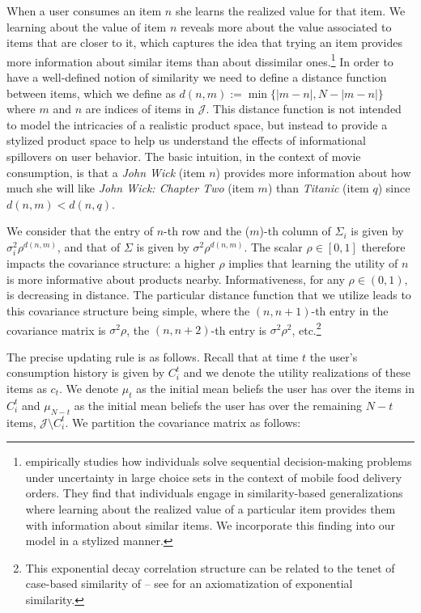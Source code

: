 \documentclass[manuscript]{acmart}
\newcommand{\xhdr}[1]{\vspace{1mm} \noindent{\bf #1}}
\begin{document}
\xhdr{User Learning\dgedit{.}}
When a user consumes an item $n$ she learns the realized value for that item. We   learning about the value of item $n$ reveals more about the value associated to items that are closer to it, which captures the idea that trying an item provides more information about similar items than about dissimilar ones.\footnote{\cite{schulz2019structured} empirically studies how individuals solve sequential decision-making problems under uncertainty in large choice sets in the context of mobile food delivery orders. They find that individuals engage in similarity-based generalizations where learning about the realized value of a particular item provides them with information about similar items. We incorporate this finding into our model in a stylized manner.} In order to have a well-defined notion of similarity we need to define a distance function between items, which we define as $d(n,m):=\min\{ \lvert m - n \rvert ,N - \lvert m - n \rvert \}$ where $m$ and $n$ are indices of items in $\mathcal{J}$. This distance function is not intended to model the intricacies of a realistic product space, but instead to provide a stylized product space to help us understand the effects of informational spillovers on user behavior. The basic intuition, in the context of movie consumption, is that a  \textit{John Wick} (item $n$) provides more information about how much she will like \textit{John Wick: Chapter Two} (item $m$) than \textit{Titanic} (item $q$) since $d(n, m) < d(n, q)$. 
\par
We consider that the entry of $n$-th row and the ($m$)-th column of $\Sigma_i$ is given by $\sigma_i^2 \rho^{d(n,m)}$, and that of $\Sigma$ is given by $\sigma^2 \rho^{d(n,m)}$. The scalar $\rho \in [0,1]$ therefore impacts the covariance structure: a higher $\rho$ implies that learning the utility of $n$ is more informative about products nearby. Informativeness, for any $\rho \in (0,1)$, is decreasing in distance. The particular distance function that we utilize leads to this covariance structure being simple, where the $(n,n+1)$-th entry in the covariance matrix is $\sigma^{2} \rho$, the $(n,n+2)$-th entry is $\sigma^{2} \rho^2$, etc.\footnote{This exponential decay correlation structure can be related to the tenet of case-based similarity of \cite{gilboa1995case} -- see \cite{billot2008axiomatization} for an axiomatization of exponential similarity.}
\par
The precise updating rule is as follows. Recall that at time $t$ the user's consumption history is given by $C_{i}^{t}$ and we denote the utility realizations of these items as $c_t$. We denote $\mu_t$ as the initial mean beliefs the user has over the items in $C_{i}^{t}$ and $\mu_{N-t}$ as the initial mean beliefs the user has over the remaining $N-t$ items, $\mathcal{J} \setminus C_{i}^{t}$. We partition the covariance matrix as follows:
\end{document}
